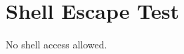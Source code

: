\documentclass{article}
\begin{document}
\section{Shell Escape Test}
No shell access allowed.
\end{document}
